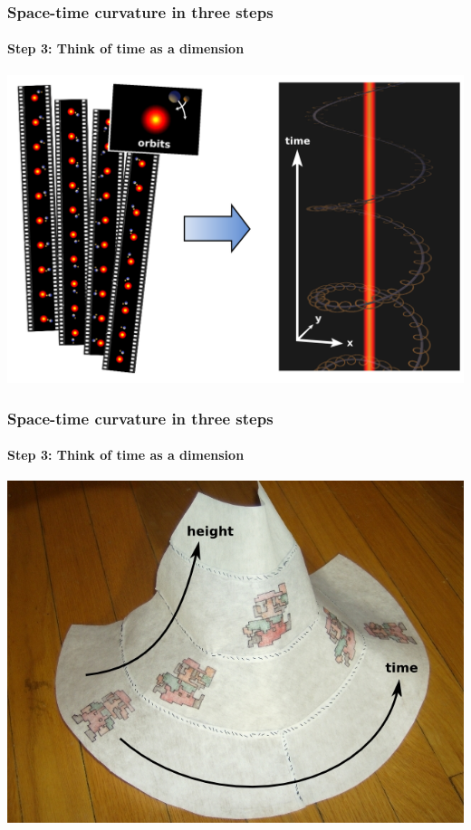 \documentclass[compress]{beamer}
\begin{document}
\begin{frame}
\frametitle{Space-time curvature in three steps}
\framesubtitle{Step 3: Think of time as a dimension}

\begin{center}
\includegraphics[width=\linewidth]{pictures/timedimension.png}
\end{center}
\end{frame}

\begin{frame}
\frametitle{Space-time curvature in three steps}
\framesubtitle{Step 3: Think of time as a dimension}

\begin{center}
\includegraphics[width=0.95\linewidth]{pictures/leap2.jpg}
\end{center}
\end{frame}
\end{document}

